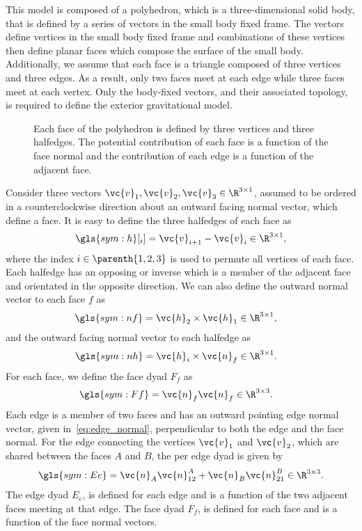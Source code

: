 This model is composed of a \gls{polyhedron}, which is a three-dimensional solid body, that is defined by a series of vectors in the small body fixed frame.
The vectors define vertices in the small body fixed frame and combinations of these vertices then define planar faces which compose the surface of the small body.
Additionally, we assume that each face is a triangle composed of three vertices and three edges.
As a result, only two faces meet at each edge while three faces meet at each vertex.
Only the body-fixed vectors, and their associated topology, is required to define the exterior gravitational model.

\begin{figure}[htbp]
    \centering
    
    \caption{Each face of the polyhedron is defined by three vertices and three halfedges.
    The potential contribution of each face is a function of the face normal and the contribution of each edge is a function of the adjacent face.\label{fig:polyhedron_face}}
\end{figure}
Consider three vectors \( \vc{v}_1, \vc{v}_2, \vc{v}_3 \in \R^{3 \times 1} \), assumed to be ordered in a counterclockwise direction about an outward facing normal vector, which define a face.
It is easy to define the three halfedges of each face as
\begin{align}\label{eq:edges}
    \gls{sym:h}[_i] = \vc{v}_{i+1} - \vc{v}_i \in \R^{3 \times 1 },
\end{align}
where the index \( i \in \parenth{1,2,3} \) is used to permute all vertices of each face.
Each halfedge has an opposing or inverse which is a member of the adjacent face and orientated in the opposite direction.
We can also define the outward normal vector to each face \( f \) as
\begin{align}\label{eq:face_normal}
    \gls{sym:nf} &= \vc{h}_2 \times \vc{h}_1 \in \R^{3 \times 1},
\end{align}
and the outward facing normal vector to each halfedge as
\begin{align}\label{eq:edge_normal}
    \gls{sym:nh} &=  \vc{h}_i \times \vc{n}_f \in \R^{3 \times 1}.
\end{align}
For each face, we define the face dyad \( F_f \) as
\begin{align}\label{eq:face_dyad}
    \gls{sym:Ff} &= \vc{n}_f \vc{n}_f \in \R^{3 \times 3}.
\end{align}
Each edge is a member of two faces and has an outward pointing edge normal vector, given in~\cref{eq:edge_normal}, perpendicular to both the edge and the face normal.
For the edge connecting the vertices \( \vc{v}_1 \) and \( \vc{v}_2 \), which are shared between the faces \(A\) and \( B\), the per edge dyad is given by
\begin{align}\label{eq:edge_dyad}
    \gls{sym:Ee} = \vc{n}_A \vc{n}_{12}^A + \vc{n}_B \vc{n}_{21}^B \in \R^{3 \times 3}.
\end{align}
The edge dyad \( E_e  \), is defined for each edge and is a function of the two adjacent faces meeting at that edge.
The face dyad \( F_f \), is defined for each face and is a function of the face normal vectors.

